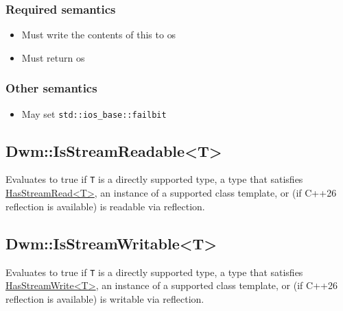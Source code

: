 \begin{minipage}{\textwidth}
\subsubsection{Required semantics}
\begin{itemize}[noitemsep,nolistsep]
  \item Must write the contents of {\ttfamily *this} to {\ttfamily os}
  \item Must return {\ttfamily os}
\end{itemize}

\subsubsection{Other semantics}
\begin{itemize}[noitemsep,nolistsep]
  \item May set \texttt{std::ios\_base::failbit}
\end{itemize}

\subsection{\ttfamily Dwm::IsStreamReadable<T>}
\label{concept:DwmIsStreamReadable}
Evaluates to true if \texttt{T} is a directly supported type, a type that
satisfies \hyperlink{concept:HasStreamRead}{\ttfamily HasStreamRead<T>},
an instance of a supported class template, or (if C++26 reflection is
available) is readable via reflection.

\subsection{\ttfamily Dwm::IsStreamWritable<T>}
\label{concept:DwmIsStreamWritable}
Evaluates to true if \texttt{T} is a directly supported type, a type that
satisfies \hyperlink{concept:HasStreamWrite}{\ttfamily HasStreamWrite<T>},
an instance of a supported class template, or (if C++26 reflection is
available) is writable via reflection.

\vfill
\end{minipage}

